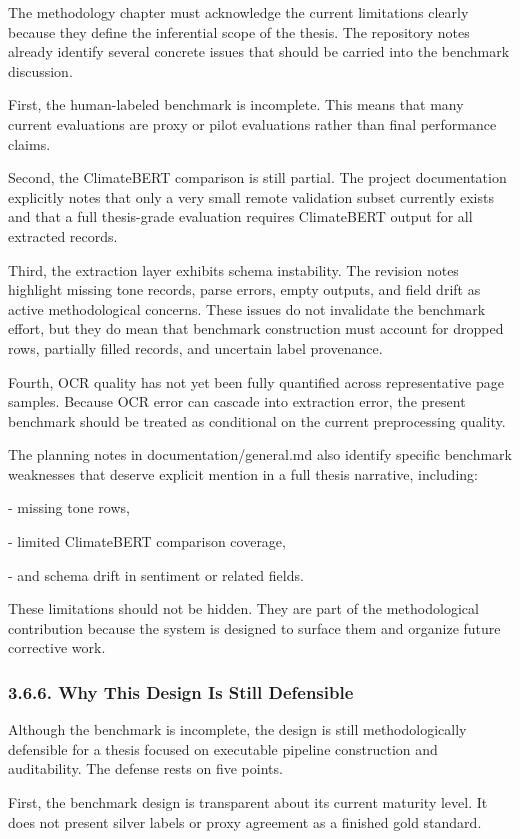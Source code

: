\documentclass{article}
\begin{document}
The methodology chapter must acknowledge the current limitations clearly because they define the inferential scope of the thesis. The repository notes already identify several concrete issues that should be carried into the benchmark discussion.

First, the human-labeled benchmark is incomplete. This means that many current evaluations are proxy or pilot evaluations rather than final performance claims.

Second, the ClimateBERT comparison is still partial. The project documentation explicitly notes that only a very small remote validation subset currently exists and that a full thesis-grade evaluation requires ClimateBERT output for all extracted records.

Third, the extraction layer exhibits schema instability. The revision notes highlight missing tone records, parse errors, empty outputs, and field drift as active methodological concerns. These issues do not invalidate the benchmark effort, but they do mean that benchmark construction must account for dropped rows, partially filled records, and uncertain label provenance.

Fourth, OCR quality has not yet been fully quantified across representative page samples. Because OCR error can cascade into extraction error, the present benchmark should be treated as conditional on the current preprocessing quality.

The planning notes in documentation/general.md also identify specific benchmark weaknesses that deserve explicit mention in a full thesis narrative, including:

- missing tone rows,

- limited ClimateBERT comparison coverage,

- and schema drift in sentiment or related fields.

These limitations should not be hidden. They are part of the methodological contribution because the system is designed to surface them and organize future corrective work.
\subsubsection*{3.6.6. Why This Design Is Still Defensible}

Although the benchmark is incomplete, the design is still methodologically defensible for a thesis focused on executable pipeline construction and auditability. The defense rests on five points.

First, the benchmark design is transparent about its current maturity level. It does not present silver labels or proxy agreement as a finished gold standard.
\end{document}
